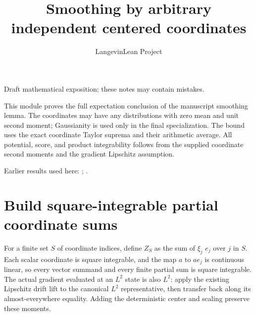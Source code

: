 \documentclass[11pt,a4paper]{article}
\title{\texorpdfstring{Smoothing by arbitrary independent centered coordinates}{Smoothing by arbitrary independent centered coordinates}}
\author{LangevinLean Project}
\date{}
\begin{document}
\maketitle
Draft mathematical exposition; these notes may contain mistakes.


This module proves the full expectation conclusion of the manuscript smoothing lemma. The coordinates may have any distributions with zero mean and unit second moment; Gaussianity is used only in the final specialization. The bound uses the exact coordinate Taylor suprema and their arithmetic average. All potential, score, and product integrability follows from the supplied coordinate second moments and the gradient Lipschitz assumption.



Earlier results used here: \cite[Section~3.13]{LangevinLean2026ULASC}; \cite[Section~3.4]{LangevinLean2026ULASC}.

\section{\texorpdfstring{Build square-integrable partial coordinate sums}{Build square-integrable partial coordinate sums}}


For a finite set \(S\) of coordinate indices, define \(Z_S\) as the sum of \(\xi_j\) \(e_j\) over \(j\) in \(S\). Each scalar coordinate is square integrable, and the map \(a\) to \(ae_j\) is continuous linear, so every vector summand and every finite partial sum is square integrable. The actual gradient evaluated at an \(L^{2}\) state is also \(L^{2}\): apply the existing Lipschitz drift lift to the canonical \(L^{2}\) representative, then transfer back along its almost-everywhere equality. Adding the deterministic center and scaling preserve these moments.
\end{document}
